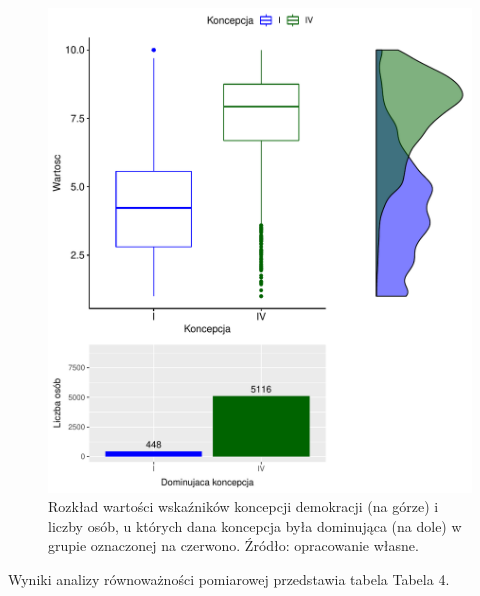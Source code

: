 \documentclass[12pt]{article}
\begin{document}
\begin{figure}

{\centering \includegraphics{text_ASA_files/figure-latex/stats-gr-3-1} 

}

\caption{Rozkład wartości wskaźników koncepcji demokracji (na górze) i liczby osób, u których dana koncepcja była dominująca (na dole) w grupie oznaczonej na czerwono. Źródło: opracowanie własne.}\label{fig:stats-gr-3}
\end{figure}

Wyniki analizy równoważności pomiarowej przedstawia tabela Tabela 4.

\begin{table}

\caption{\label{tab:tab-gr-3}Wyniki analizy równoważności pomiarowej dla grupy oznaczonej na czerwono. Źródło: opracowanie własne.}
\centering
{}
\end{table}
\end{document}
